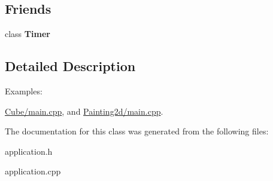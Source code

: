 \subsection*{Friends}
\begin{DoxyCompactItemize}
\item 
\hypertarget{class_tempest_1_1_application_a50de43af5bed41f30c071d8cce0e81bc}{class {\bfseries Timer}}\label{class_tempest_1_1_application_a50de43af5bed41f30c071d8cce0e81bc}

\end{DoxyCompactItemize}


\subsection{Detailed Description}
\begin{Desc}
\item[Examples\+: ]\par
\hyperlink{_cube_2main_8cpp-example}{Cube/main.\+cpp}, and \hyperlink{_painting2d_2main_8cpp-example}{Painting2d/main.\+cpp}.\end{Desc}


The documentation for this class was generated from the following files\+:\begin{DoxyCompactItemize}
\item 
application.\+h\item 
application.\+cpp\end{DoxyCompactItemize}
